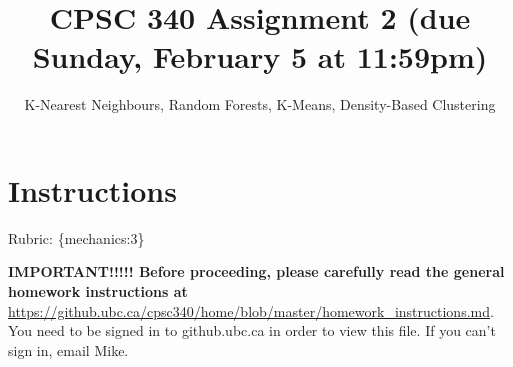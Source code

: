 \documentclass{article}
\begin{document}
\def\blu#1{{\color{blu}#1}}
\def\gre#1{{\color{gre}#1}}
\def\red#1{{\color{red}#1}}
\def\norm#1{\|#1\|}
\newcommand{\argmin}[1]{\mathop{\hbox{argmin}}_{#1}}
\newcommand{\argmax}[1]{\mathop{\hbox{argmax}}_{#1}}
\def\R{\mathbb{R}}
\newcommand{\fig}[2]{\texttt{[image: \#2]}}
\newcommand{\centerfig}[2]{\begin{center}\texttt{[image: \#2]}\end{center}}
\def\items#1{\begin{itemize}#1\end{itemize}}
\def\enum#1{\begin{enumerate}#1\end{enumerate}}
\def\answer#1{\iftoggle{answers}{\blu{Answer}:\\#1}}
\def\rubric#1{Rubric: \{#1\}}{}
\newcommand{\code}[1]{}


\title{CPSC 340 Assignment 2 (due Sunday, February 5 at 11:59pm)}
\author{K-Nearest Neighbours, Random Forests, K-Means, Density-Based Clustering}
\date{}
\maketitle

\section*{Instructions}
\rubric{mechanics:3}

\textbf{IMPORTANT!!!!! Before proceeding, please carefully read the general homework instructions at} \url{https://github.ubc.ca/cpsc340/home/blob/master/homework_instructions.md}.
You need to be signed in to github.ubc.ca in order to view this file. If you can't sign in, email Mike.
\end{document}
